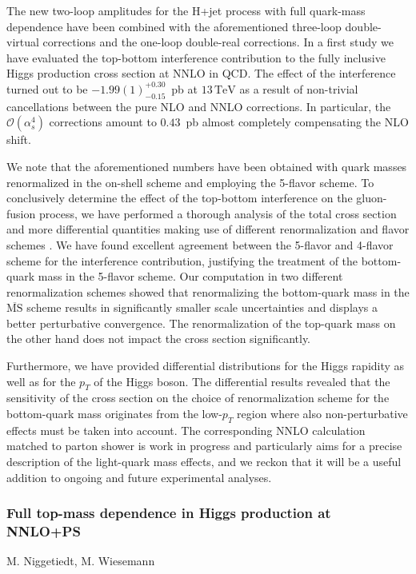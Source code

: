 \documentclass{FBR_Bericht_2025}
\begin{document}
\begin{refsection}
The new two-loop amplitudes for the H+jet process with full quark-mass dependence have been combined with the aforementioned three-loop double-virtual corrections and the one-loop double-real corrections. In a first study \cite{Czakon:2023kqm} we have evaluated the top-bottom interference contribution to the fully inclusive Higgs production cross section at NNLO in QCD. The effect of the interference turned out to be $-1.99(1)^{+0.30}_{-0.15}$~pb at $13\,\mathrm{TeV}$ as a result of non-trivial cancellations between the pure NLO and NNLO corrections. In particular, the $\mathcal{O}(\alpha_s^4)$ corrections amount to $0.43$~pb almost completely compensating the NLO shift.

We note that the aforementioned numbers have been obtained with quark masses renormalized in the on-shell scheme and employing the 5-flavor scheme. To conclusively determine the effect of the top-bottom interference on the gluon-fusion process, we have performed a thorough analysis of the total cross section and more differential quantities making use of different renormalization and flavor schemes \cite{Czakon:2024ywb}. We have found excellent agreement between the 5-flavor and 4-flavor scheme for the interference contribution, justifying the treatment of the bottom-quark mass in the 5-flavor scheme. Our computation in two different renormalization schemes showed that renormalizing the bottom-quark mass in the $\overline{\mathrm{MS}}$ scheme results in significantly smaller scale uncertainties and displays a better perturbative convergence. The renormalization of the top-quark mass on the other hand does not impact the cross section significantly.

Furthermore, we have provided differential distributions for the Higgs rapidity as well as for the $p_T$ of the Higgs boson. The differential results revealed that the sensitivity of the cross section on the choice of renormalization scheme for the bottom-quark mass originates from the low-$p_T$ region where also non-perturbative effects must be taken into account. The corresponding NNLO calculation matched to parton shower is work in progress and particularly aims for a precise description of the light-quark mass effects, and we reckon that it will be a useful addition to ongoing and future experimental analyses.
%
\subsubsection{Full top-mass dependence in Higgs production at NNLO+PS}
\begin{Namen}
M. Niggetiedt, M. Wiesemann
\end{Namen}


\end{refsection}
\end{document}
